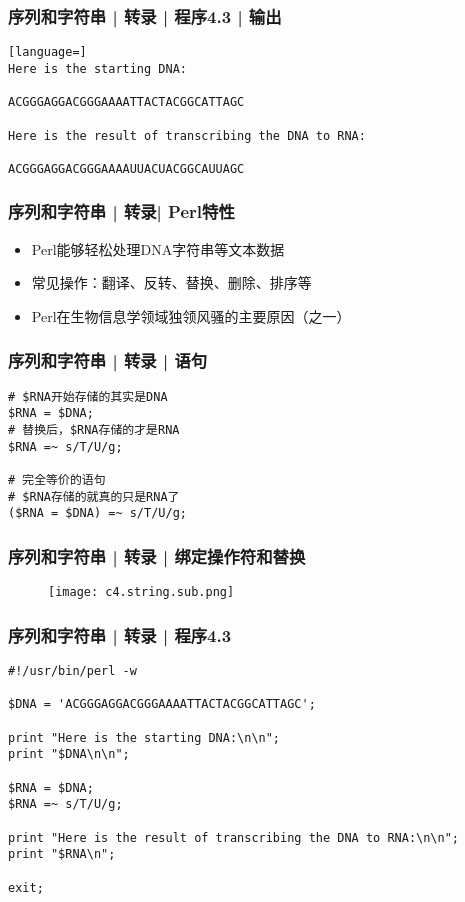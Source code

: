 \begin{frame}[fragile]
  \frametitle{序列和字符串 | 转录 | 程序4.3 | 输出}
\begin{lstlisting}[language=]
Here is the starting DNA:

ACGGGAGGACGGGAAAATTACTACGGCATTAGC

Here is the result of transcribing the DNA to RNA:

ACGGGAGGACGGGAAAAUUACUACGGCAUUAGC
\end{lstlisting}
\end{frame}

\begin{frame}
  \frametitle{序列和字符串 | 转录| Perl特性}
  \begin{itemize}
    \item Perl能够轻松处理DNA字符串等文本数据
    \item 常见操作：翻译、反转、替换、删除、排序等
    \item Perl在生物信息学领域独领风骚的主要原因（之一）
  \end{itemize}
\end{frame}

\begin{frame}[fragile]
  \frametitle{序列和字符串 | 转录 | \alert{语句}}
\begin{lstlisting}
# $RNA开始存储的其实是DNA
$RNA = $DNA;
# 替换后，$RNA存储的才是RNA
$RNA =~ s/T/U/g;

# 完全等价的语句
# $RNA存储的就真的只是RNA了
($RNA = $DNA) =~ s/T/U/g;
\end{lstlisting}
\end{frame}

\begin{frame}
  \frametitle{序列和字符串 | 转录 | \alert{绑定操作符和替换}}
  \begin{figure}
    \centering
    \texttt{[image: c4.string.sub.png]}
  \end{figure}
\end{frame}

\begin{frame}[fragile]
  \frametitle{序列和字符串 | 转录 | \alert{程序4.3}}
\begin{lstlisting}
#!/usr/bin/perl -w

$DNA = 'ACGGGAGGACGGGAAAATTACTACGGCATTAGC';

print "Here is the starting DNA:\n\n";
print "$DNA\n\n";

$RNA = $DNA;
$RNA =~ s/T/U/g;

print "Here is the result of transcribing the DNA to RNA:\n\n";
print "$RNA\n";

exit;
\end{lstlisting}
\end{frame}


